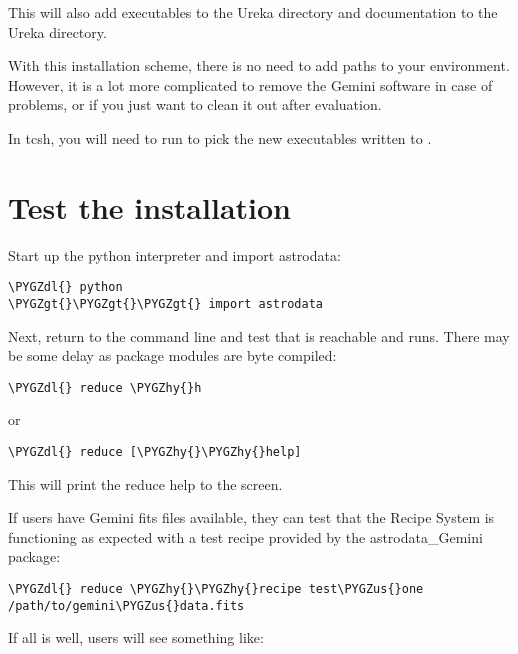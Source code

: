 \documentclass[letterpaper,10pt,english]{sphinxmanual}
\def\PYGZus{\char`\_}
\def\PYGZgt{\char`\>}
\def\PYGZdl{\char`\$}
\def\PYGZhy{\char`\-}
\begin{document}
This will also add executables to the Ureka  directory and documentation to
the Ureka  directory.

With this installation scheme, there is no need to add paths to your environment.
However, it is a lot more complicated to remove the Gemini software in case of
problems, or if you just want to clean it out after evaluation.

In tcsh, you will need to run  to pick the new executables written to
.


\section{Test the installation}
\label{userenv:test}\label{userenv:test-the-installation}
Start up the python interpreter and import astrodata:

\begin{Verbatim}[commandchars=\\\{\}]
\PYGZdl{} python
\PYGZgt{}\PYGZgt{}\PYGZgt{} import astrodata
\end{Verbatim}

Next, return to the command line and test that  is reachable
and runs. There may be some delay as package modules are byte compiled:

\begin{Verbatim}[commandchars=\\\{\}]
\PYGZdl{} reduce \PYGZhy{}h
\end{Verbatim}

or

\begin{Verbatim}[commandchars=\\\{\}]
\PYGZdl{} reduce [\PYGZhy{}\PYGZhy{}help]
\end{Verbatim}

This will print the reduce help to the screen.

If users have Gemini fits files available, they can test that the Recipe System
is functioning as expected with a test recipe provided by the astrodata\_Gemini
package:

\begin{Verbatim}[commandchars=\\\{\}]
\PYGZdl{} reduce \PYGZhy{}\PYGZhy{}recipe test\PYGZus{}one /path/to/gemini\PYGZus{}data.fits
\end{Verbatim}

If all is well, users will see something like:
\end{document}

